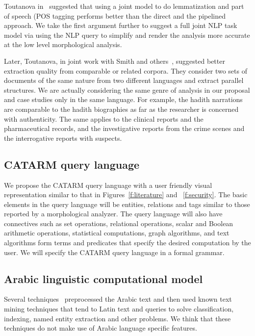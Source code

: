 \documentclass[12pt]{article}
\begin{document}
Toutanova in~\cite{Tou09} suggested that using 
a joint model to do lemmatization and part of speech (POS
tagging performs better
than the direct and the pipelined approach. 
We take the first argument further to suggest a full joint NLP task 
model via using the NLP query to simplify and render the analysis
more accurate at the low level morphological analysis.

Later, Toutanova, in joint work with Smith and others~\cite{Smi10},
suggested better extraction quality from comparable or related
corpora. 
They consider two sets of documents of the same nature from
two different languages and extract parallel structures. 
We are actually considering the same genre of analysis in 
our proposal and case studies only in the same language. 
For example, the hadith narrations are comparable to the hadith 
biographies as far as the researcher is concerned with authenticity.
The same applies to the clinical reports and the pharmaceutical 
records, and the investigative reports from the crime scenes
and the interrogative reports with suspects.

\subsection{CATARM query language}
\label{s:design:query}

We propose the CATARM query language with a user friendly
visual representation similar to that in Figures~\ref{f:literature} and
~\ref{f:security}. 
The basic elements in the query language will be entities, relations
and tags similar to those reported by a morphological analyzer. 
The query language will also have connectives such as set operations, 
relational operations, 
scalar and Boolean arithmetic operations, 
statistical computations, graph algorithms, and text algorithms
form terms and predicates that specify the desired computation
by the user. 
We will specify the CATARM query language in a formal grammar.

\subsection{Arabic linguistic computational model }
\label{s:design:lcm}

Several techniques~\cite{AEL07,Ham07,Abd07,MEl03} 
preprocessed the Arabic text and then used known text 
mining techniques that tend to Latin text and queries
to solve classification, indexing, named entity 
extraction and other problems.
We think that these techniques do not make use 
of Arabic language specific features.
\end{document}
